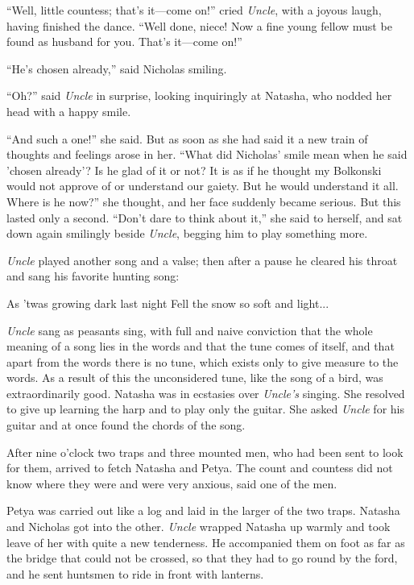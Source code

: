``Well, little countess; that's it---come on!'' cried
\emph{Uncle}, with a joyous laugh, having finished the
dance. ``Well done, niece! Now a fine young fellow must be found
as husband for you. That's it---come on!''

``He's chosen already,'' said Nicholas smiling.

``Oh?'' said \emph{Uncle} in surprise, looking inquiringly at
Natasha, who nodded her head with a happy smile.

``And such a one!'' she said. But as soon as she had said it a
new train of thoughts and feelings arose in her. ``What did
Nicholas' smile mean when he said 'chosen already'? Is he glad of
it or not? It is as if he thought my Bolkonski would not approve
of or understand our gaiety. But he would understand it
all. Where is he now?'' she thought, and her face suddenly became
serious. But this lasted only a second. ``Don't dare to think
about it,'' she said to herself, and sat down again smilingly
beside \emph{Uncle}, begging him to play something more.

\emph{Uncle} played another song and a valse; then after a pause
he cleared his throat and sang his favorite hunting song:

As 'twas growing dark last night Fell the snow so soft and
light...

\emph{Uncle} sang as peasants sing, with full and naive
conviction that the whole meaning of a song lies in the words and
that the tune comes of itself, and that apart from the words
there is no tune, which exists only to give measure to the
words. As a result of this the unconsidered tune, like the song
of a bird, was extraordinarily good. Natasha was in ecstasies
over \emph{Uncle's} singing. She resolved to give up learning the
harp and to play only the guitar. She asked \emph{Uncle} for his
guitar and at once found the chords of the song.

After nine o'clock two traps and three mounted men, who had been
sent to look for them, arrived to fetch Natasha and Petya. The
count and countess did not know where they were and were very
anxious, said one of the men.

Petya was carried out like a log and laid in the larger of the
two traps. Natasha and Nicholas got into the other. \emph{Uncle}
wrapped Natasha up warmly and took leave of her with quite a new
tenderness. He accompanied them on foot as far as the bridge that
could not be crossed, so that they had to go round by the ford,
and he sent huntsmen to ride in front with lanterns.

